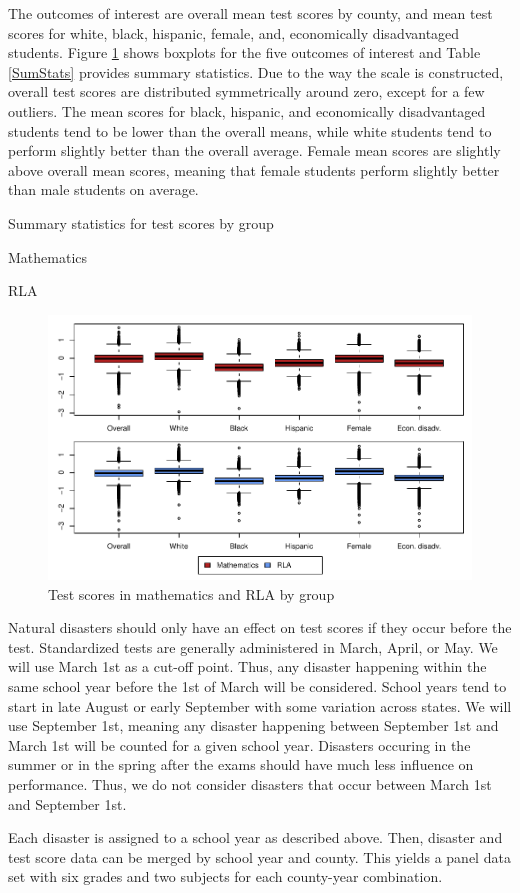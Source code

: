 The outcomes of interest are overall mean test scores by county, and mean test scores for white, black, hispanic, female, and, economically disadvantaged students. Figure \ref{DepVarsBoxplot} shows boxplots for the five outcomes of interest and Table \ref{SumStats} provides summary statistics. Due to the way the scale is constructed, overall test scores are distributed symmetrically around zero, except for a few outliers. The mean scores for black, hispanic, and economically disadvantaged students tend to be lower than the overall means, while white students tend to perform slightly better than the overall average. Female mean scores are slightly above overall mean scores, meaning that female students perform slightly better than male students on average.

\begin{table} 
	\caption{Summary statistics for test scores by group}
	\label{SumStats}
	\begin{subtable}{1\textwidth}
		\caption{Mathematics}
		\centering
		
	\end{subtable}

	\bigskip
	\begin{subtable}{1\textwidth}
		\caption{RLA}
		\centering
		
	\end{subtable}
\end{table}


\begin{figure}[!h]
	\centering
	\includegraphics[scale=1]{"../Code & Data/DepVarsBoxplot.pdf"}
	\caption{Test scores in mathematics and RLA by group}
	\label{DepVarsBoxplot}
\end{figure}


Natural disasters should only have an effect on test scores if they occur before the test. Standardized tests are generally administered in March, April, or May. We will use March 1st as a cut-off point. Thus, any disaster happening within the same school year before the 1st of March will be considered. School years tend to start in late August or early September with some variation across states. We will use September 1st, meaning any disaster happening between September 1st and March 1st will be counted for a given school year. Disasters occuring in the summer or in the spring after the exams should have much less influence on performance. Thus, we do not consider disasters that occur between March 1st and September 1st.

Each disaster is assigned to a school year as described above. Then, disaster and test score data can be merged by school year and county. This yields a panel data set with six grades and two subjects for each county-year combination.

